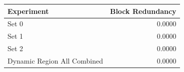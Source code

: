 \begin{tabular}{lr}
\toprule
Experiment & Block Redundancy \\
\midrule
Set 0 & 0.0000 \\
Set 1 & 0.0000 \\
Set 2 & 0.0000 \\
Dynamic Region All Combined & 0.0000 \\
\bottomrule
\end{tabular}

